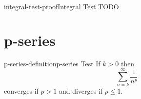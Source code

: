 \documentclass[preview]{standalone}
\begin{document}
\begin{snippetproof}{integral-test-proof}{Integral Test}{
    TODO
}
\end{snippetproof}

\section{p-series}

\begin{snippetdefinition}{p-series-definition}{p-series Test}{
    If \(k > 0\) then \[\sum_{n=k}^\infty \frac{1}{n^p}\]
    converges if \(p > 1\) and diverges if \(p \leq 1\).
}
\end{snippetdefinition}
\end{document}
